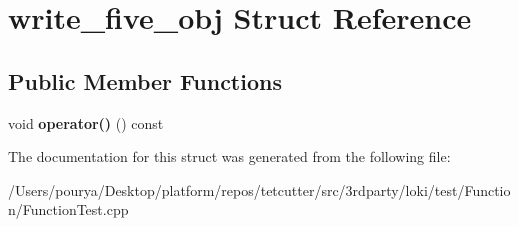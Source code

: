 \hypertarget{structwrite__five__obj}{}\section{write\+\_\+five\+\_\+obj Struct Reference}
\label{structwrite__five__obj}
\subsection*{Public Member Functions}
\begin{DoxyCompactItemize}
\item 
\hypertarget{structwrite__five__obj_a283ed6daf4149b993c3c86060a3e3b0c}{}void {\bfseries operator()} () const \label{structwrite__five__obj_a283ed6daf4149b993c3c86060a3e3b0c}

\end{DoxyCompactItemize}


The documentation for this struct was generated from the following file\+:\begin{DoxyCompactItemize}
\item 
/\+Users/pourya/\+Desktop/platform/repos/tetcutter/src/3rdparty/loki/test/\+Function/Function\+Test.\+cpp\end{DoxyCompactItemize}
